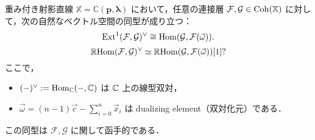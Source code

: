 \begin{thm}\cite{GL87}
重み付き射影直線 $\mathbb{X} = \mathbb{C}(\mathbf{p}, \boldsymbol{\lambda})$ において，任意の連接層 $\mathcal{F}, \mathcal{G} \in \operatorname{\mathrm{Coh}}(\mathbb{X})$ に対して，次の自然なベクトル空間の同型が成り立つ：
\[
\operatorname{\mathrm{Ext}}^1(\mathcal{F}, \mathcal{G})^\vee \cong \operatorname{\mathrm{Hom}}(\mathcal{G}, \mathcal{F}(\vec{\omega})).
\]
\[
\operatorname{\mathbb{R}\mathrm{Hom}}({\mathcal F},{\mathcal G})^\vee \simeq \operatorname{\mathbb{R}\mathrm{Hom}}({\mathcal G},{\mathcal F}(\vec{\omega}))[1]?\]
ここで，
\begin{itemize}
	\item $(-)^\vee := \operatorname{\mathrm{Hom}}_{{\mathbb C}}(-, {\mathbb C})$ は ${\mathbb C}$ 上の線型双対，
  \item $\vec{\omega} = (n - 1)\vec{c} - \sum_{i=0}^n \vec{x}_i$ は dualizing element（双対化元）である．
\end{itemize}
この同型は $\mathcal{F}, \mathcal{G}$ に関して函手的である．
\end{thm}

